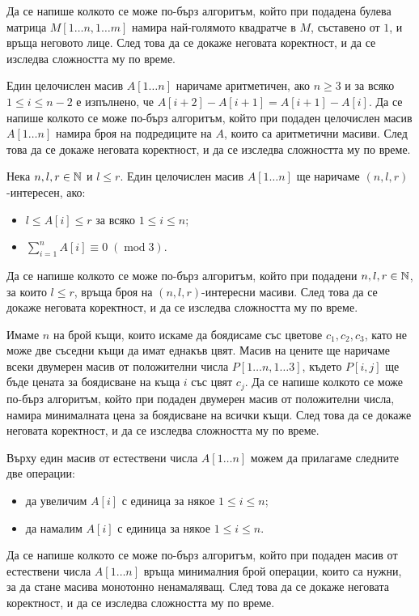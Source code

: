 \begin{problem}
Да се напише колкото се може по-бърз алгоритъм, който при подадена булева матрица $M[1 \dots n, 1 \dots m]$ намира най-голямото квадратче в $M$, съставено от $1$, и връща неговото лице.
След това да се докаже неговата коректност, и да се изследва сложността му по време.
\end{problem}

\begin{problem}
Един целочислен масив $A[1 \dots n]$ наричаме аритметичен, ако $n \geq 3$ и за всяко $1 \leq i \leq n - 2$ е изпълнено, че $A[i + 2] - A[i + 1] = A[i + 1] - A[i]$.
Да се напише колкото се може по-бърз алгоритъм, който при подаден целочислен масив $A[1 \dots n]$ намира броя на подредиците на $A$, които са аритметични масиви.
След това да се докаже неговата коректност, и да се изследва сложността му по време.
\end{problem}

\begin{problem}
Нека $n, l, r \in \mathbb{N}$ и $l \leq r$.
Един целочислен масив $A[1 \dots n]$ ще наричаме $(n, l, r)$-интересен, ако:
\begin{itemize}
    \item $l \leq A[i] \leq r$ за всяко $1 \leq i \leq n$;
    \item $\sum\limits_{i = 1}^n A[i] \equiv 0 \; (\operatorname{mod} 3)$.
\end{itemize}
Да се напише колкото се може по-бърз алгоритъм, който при подадени $n, l, r \in \mathbb{N}$, за които $l \leq r$, връща броя на $(n, l, r)$-интересни масиви.
След това да се докаже неговата коректност, и да се изследва сложността му по време.
\end{problem}

\begin{problem}
Имаме $n$ на брой къщи, които искаме да боядисаме със цветове $c_1, c_2, c_3$, като не може две съседни къщи да имат еднакъв цвят.
Масив на цените ще наричаме всеки двумерен масив от положителни числа $P[1 \dots n, 1 \dots 3]$, където $P[i, j]$ ще бъде цената за боядисване на къща $i$ със цвят $c_j$.
Да се напише колкото се може по-бърз алгоритъм, който при подаден двумерен масив от положителни числа, намира минималната цена за боядисване на всички къщи.
След това да се докаже неговата коректност, и да се изследва сложността му по време.
\end{problem}

\begin{problem}
Върху един масив от естествени числа $A[1 \dots n]$ можем да прилагаме следните две операции:
\begin{itemize}
    \item да увеличим $A[i]$ с единица за някое $1 \leq i \leq n$;
    \item да намалим $A[i]$ с единица за някое $1 \leq i \leq n$.
\end{itemize}
Да се напише колкото се може по-бърз алгоритъм, който при подаден масив от естествени числа $A[1 \dots n]$ връща минималния брой операции, които са нужни, за да стане масива монотонно ненамаляващ.
След това да се докаже неговата коректност, и да се изследва сложността му по време.
\end{problem}